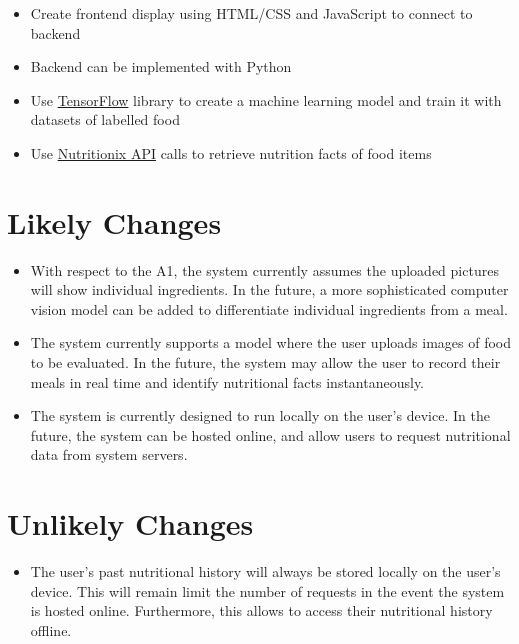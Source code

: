\documentclass[12pt]{article}
\newcounter{lcnum} %
\newcounter{ulcnum} %
\begin{document}
\begin{itemize}
	\item Create frontend display using HTML/CSS and JavaScript to connect to backend
	\item Backend can be implemented with Python
	\item Use \href{https://www.tensorflow.org/}{TensorFlow} library to create a machine learning model and train it with datasets of labelled food
	\item Use \href{https://www.nutritionix.com/business/api}{Nutritionix API} calls to retrieve nutrition facts of food items
\end{itemize}

\section{Likely Changes}   

\noindent \begin{itemize}

\item[LC\refstepcounter{lcnum}\thelcnum\label{LC_meaningfulLabel}:] 
With respect to the A1, the system currently assumes the uploaded pictures will 
show individual ingredients. In the future, a more sophisticated computer 
vision model can be added to differentiate individual ingredients from a meal.

\item[LC\refstepcounter{lcnum}\thelcnum\label{LC_meaningfulLabel}:] 
The system currently supports a model where the user uploads images of food to 
be evaluated. In the future, the system may allow the user to record their 
meals in real time and identify nutritional facts instantaneously.

\item[LC\refstepcounter{lcnum}\thelcnum\label{LC_meaningfulLabel}:] 
The system is currently designed to run locally on the user's device. In the 
future, the system can be hosted online, and allow users to request nutritional 
data from system servers.

\end{itemize}

\section{Unlikely Changes}    

\noindent \begin{itemize}

\item[ULC\refstepcounter{ulcnum}\theulcnum\label{ULC_meaningfulLabel}:] 
The user's past nutritional history will always be stored locally on the user's 
device. This will remain limit the number of requests in the event the system 
is hosted online. Furthermore, this allows to access their nutritional history 
offline.

\end{itemize}
\end{document}
